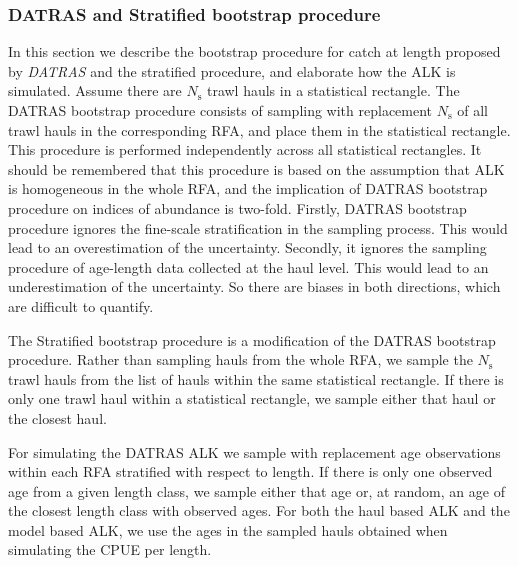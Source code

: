 \documentclass[a4paper 12pt]{article}
\numberwithin{equation}{section}
\begin{document}
\subsubsection{DATRAS and Stratified bootstrap procedure}
\label{sec:datrasstratifiedbootstrap}
In this section we describe the bootstrap procedure for catch at length proposed by \emph{DATRAS} \citep{ICES2013} and the stratified procedure, and elaborate how the ALK is simulated. Assume there are $N_{\text{s}}$ trawl hauls in a statistical rectangle. The DATRAS bootstrap procedure consists of sampling with replacement $N_{\text{s}}$ of all trawl hauls in the corresponding RFA, and place them in the statistical rectangle. This procedure is performed independently across all statistical rectangles. It should be remembered that this procedure is based on the assumption that ALK is homogeneous in the whole RFA, and the implication of DATRAS bootstrap procedure on indices of abundance is two-fold. Firstly, DATRAS bootstrap procedure ignores the fine-scale stratification in the sampling process. This would lead to an overestimation of the uncertainty. Secondly, it ignores the sampling procedure of age-length data collected at the haul level. This would lead  to an underestimation of the uncertainty. So there are biases in both directions, which are difficult to quantify.

The Stratified bootstrap procedure is a modification of the DATRAS bootstrap procedure. Rather than sampling hauls from the whole RFA, we  sample the $N_{\text{s}}$ trawl hauls from the list of hauls within the same statistical rectangle. If there is only one trawl haul within a statistical rectangle, we sample either that haul or the closest haul.

For simulating the DATRAS ALK we sample with replacement age observations within each RFA stratified with respect to length. If there is only one observed age from a given length class, we sample either that age or, at random, an age of the closest length class with observed ages. For both the haul based ALK and the model based ALK, we use the ages in the sampled hauls obtained when simulating the CPUE per length. %
\end{document}
